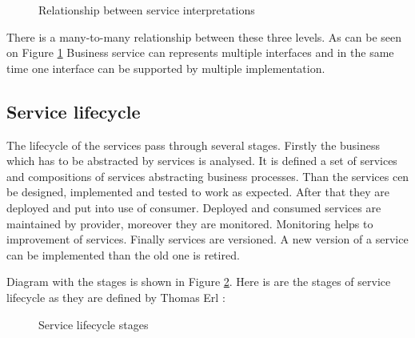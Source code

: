 \begin{figure}[htp] 
\caption{Relationship between service interpretations}
\label{fig:service-levels}
\end{figure}

There is a many-to-many relationship between these three levels. As can be seen on Figure \ref{fig:service-levels} Business service can represents multiple interfaces and in the same time one interface can be supported by multiple implementation.

\subsection{Service lifecycle}
\label{subsec:lifecycle}
The lifecycle of the services pass through several stages. Firstly the business which has to be abstracted by services is analysed. It is defined a set of services and compositions of services abstracting business processes. Than the services cen be designed, implemented and tested to work as expected. After that they are deployed and put into use of consumer. Deployed and consumed services are maintained by provider, moreover they are monitored. Monitoring helps to improvement of services. Finally services are versioned. A new version of a service can be implemented than the old one is retired.

Diagram with the stages is shown in Figure \ref{fig:service-lifecycle}. Here is are the stages of service lifecycle as they are defined by Thomas Erl \cite{soa-governance}:

\begin{figure}[htp] 
\caption{Service lifecycle stages}
\label{fig:service-lifecycle}
\end{figure}


